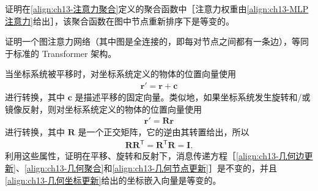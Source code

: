 \documentclass[../../main.tex]{subfiles}
\begin{document}
\begin{exercise}[$\star\star$]\label{exercise:ch13-08}
证明在\eqref{align:ch13-注意力聚合}定义的聚合函数中［注意力权重由\eqref{align:ch13-MLP注意力}给出］，该聚合函数在图中节点重新排序下是等变的。
\end{exercise}

\begin{exercise}[$\star$]\label{exercise:ch13-09}
证明一个图注意力网络（其中图是全连接的，即每对节点之间都有一条边），等同于标准的 Transformer 架构。
\end{exercise}

\begin{exercise}[$\star\star$]\label{exercise:ch13-10}
当坐标系统被平移时，对坐标系统定义的物体的位置向量使用
\begin{align}
\bm{r}'=\bm{r}+\bm{c}
\label{align:ch13-习题平移}
\end{align}
进行转换，其中 $\bm{c}$ 是描述平移的固定向量。类似地，如果坐标系统发生旋转和/或镜像反射，则对坐标系统定义的物体的位置向量使用
\begin{align}
\bm{r}'=\bm{R}\bm{r}
\label{align:ch13-习题旋转}
\end{align}
进行转换，其中 $\bm{R}$ 是一个正交矩阵，它的逆由其转置给出，所以
\begin{align}
\bm{R}\bm{R}^{\mathsf T}=\bm{R}^{\mathsf T}\bm{R}=\bm{I}.
\label{align:ch13-习题正交}
\end{align}
\enlargethispage{2\baselineskip}
利用这些属性，证明在平移、旋转和反射下，消息传递方程［\eqref{align:ch13-几何边更新}、\eqref{align:ch13-几何聚合}和\eqref{align:ch13-几何节点更新}］是不变的，并且\eqref{align:ch13-几何坐标更新}给出的坐标嵌入向量是等变的。
\end{exercise}
\end{document}

